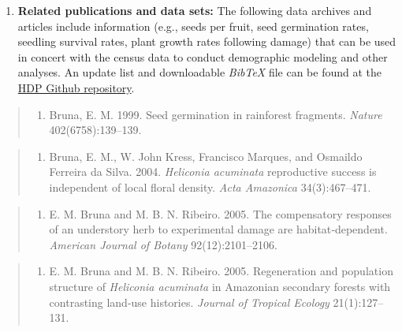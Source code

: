 \documentclass[
  12pt,
  man, donotrepeattitle,floatsintext]{apa6}
\providecommand{\tightlist}{%
  \setlength{\itemsep}{0pt}\setlength{\parskip}{0pt}}
\begin{document}
\begin{enumerate}
\def\labelenumi{\arabic{enumi}.}
\setcounter{enumi}{1}
\tightlist
\item
  \textbf{Related publications and data sets:} The following data archives and articles include information (e.g., seeds per fruit, seed germination rates, seedling survival rates, plant growth rates following damage) that can be used in concert with the census data to conduct demographic modeling and other analyses. An update list and downloadable \emph{BibTeX} file can be found at the \href{https://github.com/BrunaLab/HeliconiaSurveys}{HDP Github repository}.
\end{enumerate}

\begin{quote}
\begin{enumerate}
\def\labelenumi{\arabic{enumi}.}
\tightlist
\item
  Bruna, E. M. 1999. Seed germination in rainforest fragments. \emph{Nature} 402(6758):139--139.
\end{enumerate}
\end{quote}

\begin{quote}
\begin{enumerate}
\def\labelenumi{\arabic{enumi}.}
\setcounter{enumi}{1}
\tightlist
\item
  Bruna, E. M., W. John Kress, Francisco Marques, and Osmaildo Ferreira da Silva. 2004. \emph{Heliconia acuminata} reproductive success is independent of local floral density. \emph{Acta Amazonica} 34(3):467--471.
\end{enumerate}
\end{quote}

\begin{quote}
\begin{enumerate}
\def\labelenumi{\arabic{enumi}.}
\setcounter{enumi}{2}
\tightlist
\item
  E. M. Bruna and M. B. N. Ribeiro. 2005. The compensatory responses of an understory herb to experimental damage are habitat‐dependent. \emph{American Journal of Botany} 92(12):2101--2106.
\end{enumerate}
\end{quote}

\begin{quote}
\begin{enumerate}
\def\labelenumi{\arabic{enumi}.}
\setcounter{enumi}{3}
\tightlist
\item
  E. M. Bruna and M. B. N. Ribeiro. 2005. Regeneration and population structure of \emph{Heliconia acuminata} in Amazonian secondary forests with contrasting land-use histories. \emph{Journal of Tropical Ecology} 21(1):127--131.
\end{enumerate}
\end{quote}
\end{document}
